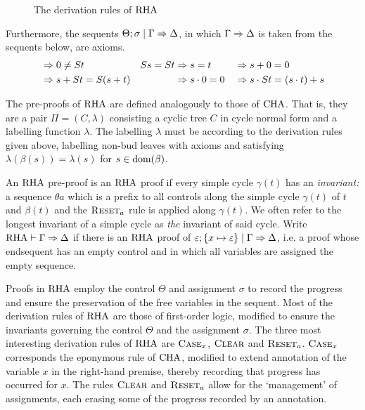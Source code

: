 \begin{definition}
\begin{figure}
\begin{mathpar}

    \end{mathpar}
    
    \caption{The derivation rules of $\RHA$}
    \label{fig:rpa}
  \end{figure}
  Furthermore, the sequents $\Theta; \sigma \rsep \Gamma \sdash \Delta$, in which
  $\Gamma \sdash \Delta$ is taken from the sequents below, are axioms.
  \begin{align*}
    & \sdash 0 \neq S t & S s = S t & \sdash s = t && \sdash s + 0 = 0 \\
    &\sdash s + St = S(s + t) & & \sdash s \cdot 0 = 0 && \sdash s \cdot St = (s \cdot t) + s
  \end{align*}

  The pre-proofs of $\RHA$ are defined analogously to those of $\CHA$. That is,
  they are a pair $\Pi = (C, \lambda)$ consisting a cyclic tree $C$ in cycle
  normal form and a
  labelling function $\lambda$. The labelling $\lambda$ must
  be according to the derivation rules given above, labelling non-bud leaves
  with axioms and satisfying $\lambda(\beta(s)) = \lambda(s)$ for $s \in
  \dom(\beta)$.

  An $\RHA$ pre-proof is an $\RHA$ proof if every simple cycle $\gamma(t)$
  has an \emph{invariant}\emph{:} a sequence $\theta a$
  which is a prefix to all controls along the simple cycle $\gamma(t)$ of $t$ and
  $\beta(t)$ and the $\textsc{Reset}_a$ rule is applied along $\gamma(t)$. We
  often refer to the longest invariant of a simple cycle
  as \emph{the} invariant of said cycle. Write $\RHA \vdash \Gamma
  \sdash \Delta$ if there is an $\RHA$ proof of $\varepsilon; \{x \mapsto
  \varepsilon\} \rsep \Gamma \sdash \Delta$, i.e. a proof whose endsequent has an
  empty control and in which all variables are assigned the empty sequence.
\end{definition}

Proofs in $\RHA$ employ the control $\Theta$ and assignment $\sigma$ to record the
progress and ensure the preservation of the free variables in the sequent. Most
of the derivation rules of $\RHA$ are those of first-order logic, modified to
ensure the invariants governing the control $\Theta$ and the assignment
$\sigma$. The three most interesting derivation rules of $\RHA$ are $\RCase_x$,
$\RClear$ and $\RReset_a$. $\RCase_x$ corresponds the eponymous rule of $\CHA$,
modified to extend annotation of the variable $x$ in the right-hand
premise, thereby recording that progress has occurred for $x$. The rules
$\RClear$ and $\RReset_a$ allow for the `management' of assignments, each
erasing some of the progress recorded by an annotation.

